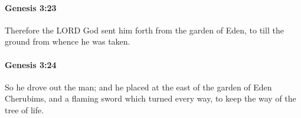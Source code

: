 		\paragraph{Genesis 3:23} %
			\label{GENESIS-3-23}

			Therefore the LORD God sent him forth from the garden of Eden, to till the ground from whence he was taken.


		\paragraph{Genesis 3:24} %
			\label{GENESIS-3-24}

			So he drove out the man; and he placed at the east of the garden of Eden Cherubims, and a flaming sword which turned every way, to keep the way of the tree of life.

